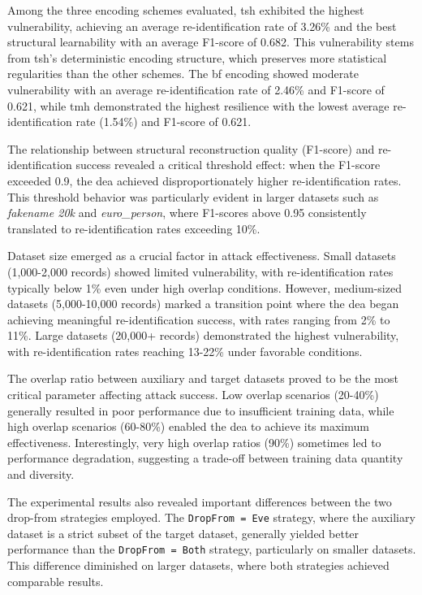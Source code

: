 Among the three encoding schemes evaluated, \ac{tsh} exhibited the highest vulnerability, achieving an average re-identification rate of 3.26\% and the best structural learnability with an average F1-score of 0.682.
This vulnerability stems from \ac{tsh}'s deterministic encoding structure, which preserves more statistical regularities than the other schemes.
The \ac{bf} encoding showed moderate vulnerability with an average re-identification rate of 2.46\% and F1-score of 0.621, while \ac{tmh} demonstrated the highest resilience with the lowest average re-identification rate (1.54\%) and F1-score of 0.621.

The relationship between structural reconstruction quality (F1-score) and re-identification success revealed a critical threshold effect: when the F1-score exceeded 0.9, the \ac{dea} achieved disproportionately higher re-identification rates.
This threshold behavior was particularly evident in larger datasets such as \textit{fakename 20k} and \textit{euro\_person}, where F1-scores above 0.95 consistently translated to re-identification rates exceeding 10\%.

Dataset size emerged as a crucial factor in attack effectiveness.
Small datasets (1,000-2,000 records) showed limited vulnerability, with re-identification rates typically below 1\% even under high overlap conditions.
However, medium-sized datasets (5,000-10,000 records) marked a transition point where the \ac{dea} began achieving meaningful re-identification success, with rates ranging from 2\% to 11\%.
Large datasets (20,000+ records) demonstrated the highest vulnerability, with re-identification rates reaching 13-22\% under favorable conditions.

The overlap ratio between auxiliary and target datasets proved to be the most critical parameter affecting attack success.
Low overlap scenarios (20-40\%) generally resulted in poor performance due to insufficient training data, while high overlap scenarios (60-80\%) enabled the \ac{dea} to achieve its maximum effectiveness.
Interestingly, very high overlap ratios (90\%) sometimes led to performance degradation, suggesting a trade-off between training data quantity and diversity.

The experimental results also revealed important differences between the two drop-from strategies employed.
The \texttt{DropFrom = Eve} strategy, where the auxiliary dataset is a strict subset of the target dataset, generally yielded better performance than the \texttt{DropFrom = Both} strategy, particularly on smaller datasets.
This difference diminished on larger datasets, where both strategies achieved comparable results.

